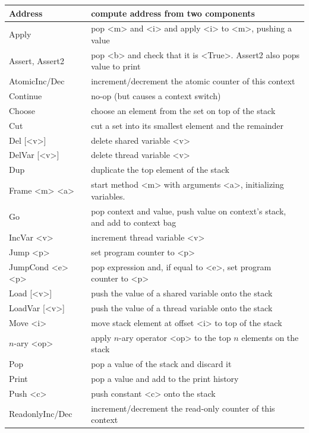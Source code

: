 \documentclass{report}
\begin{document}
{\small
\begin{tabular}{|l|l|}
\hline
Address & compute address from two components \\
\hline
Apply & pop <{m}> and <{i}> and apply <{i}> to <{m}>, pushing a value \\
\hline
Assert, Assert2 & pop <{b}> and check that it is <{True}>.  Assert2 also pops value to print \\
\hline
AtomicInc/Dec & increment/decrement the atomic counter of this context \\
\hline
Continue & no-op (but causes a context switch) \\
\hline
Choose & choose an element from the set on top of the stack \\
\hline
Cut & cut a set into its smallest element and the remainder \\
\hline
Del [<{v}>] & delete shared variable <{v}> \\
\hline
DelVar [<{v}>] & delete thread variable <{v}> \\
\hline
Dup & duplicate the top element of the stack \\
\hline
Frame <{m}> <{a}> & start method <{m}> with arguments <{a}>,
initializing variables.  \\
\hline
Go & pop context and value, push value on context's stack, and add to context bag \\
\hline
IncVar <{v}> & increment thread variable <{v}> \\
\hline
Jump <{p}> & set program counter to <{p}> \\
\hline
JumpCond <{e}> <{p}> & pop expression and, if equal to <{e}>, set program counter to <{p}> \\
\hline
Load [<{v}>] & push the value of a shared variable onto the stack \\
\hline
LoadVar [<{v}>] & push the value of a thread variable onto the stack \\
\hline
Move <{i}> & move stack element at offset <{i}> to top of the stack \\
\hline
$n$-ary <{op}> & apply $n$-ary operator <{op}> to the top $n$ elements on the stack \\
\hline
Pop & pop a value of the stack and discard it \\
\hline
Print & pop a value and add to the print history \\
\hline
Push <{c}> & push constant <{c}> onto the stack \\
\hline
ReadonlyInc/Dec & increment/decrement the read-only counter of this context \\

\end{tabular}}
\end{document}
